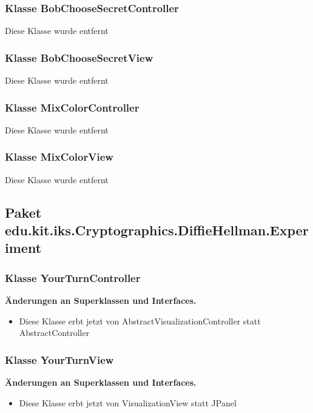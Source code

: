 \documentclass{article}
\begin{document}
	\subsubsection{Klasse BobChooseSecretController}
    Diese Klasse wurde entfernt\newline

	\subsubsection{Klasse BobChooseSecretView}
    Diese Klasse wurde entfernt\newline

	\subsubsection{Klasse MixColorController}
    Diese Klasse wurde entfernt\newline

	\subsubsection{Klasse MixColorView}
    Diese Klasse wurde entfernt\newline


  \subsection{Paket edu.kit.iks.Cryptographics.DiffieHellman.Experiment}

	\subsubsection{Klasse YourTurnController}

	    \textbf{Änderungen an Superklassen und Interfaces.}\newline
        \begin{itemize}
            \item Diese Klasse erbt jetzt von AbstractVisualizationController statt AbstractController\newline
        \end{itemize}

	\subsubsection{Klasse YourTurnView}

	    \textbf{Änderungen an Superklassen und Interfaces.}\newline
        \begin{itemize}
            \item Diese Klasse erbt jetzt von VisualizationView statt JPanel\newline
        \end{itemize}
\end{document}
